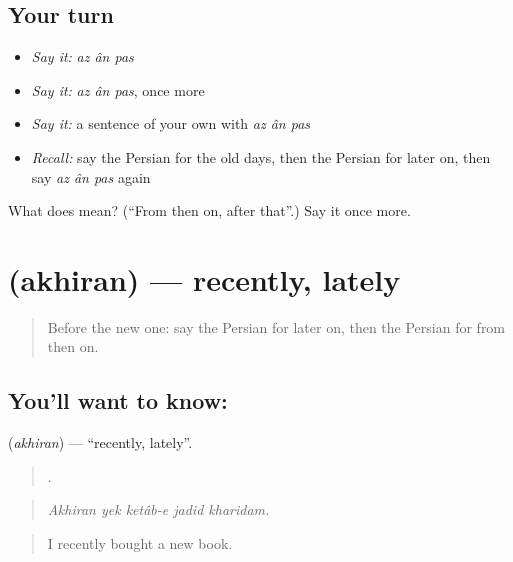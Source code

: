\subsection*{Your turn}
\begin{itemize}
\raggedright
  \item \emph{Say it:} \emph{az ân pas}
  \item \emph{Say it:} \emph{az ân pas}, once more
  \item \emph{Say it:} a sentence of your own with \emph{az ân pas}
  \item \emph{Recall:} say the Persian for the old days, then the Persian for later on, then say \emph{az ân pas} again
\end{itemize}

\begin{tcolorbox}[breakable,colback=teal!4,colframe=teal!35!black,title={Before you move on}]
What does    mean? (\textquotedblleft{}From then on, after that\textquotedblright{}.) Say it once more.
\end{tcolorbox}
\section[\texorpdfstring{\fa{اخیرا} (akhiran)}{اخیرا (akhiran)}]{ (akhiran) — recently, lately}

\label{lesson:FA-C304-akhiran}



\begin{quote}
Before the new one: say the Persian for later on, then the Persian for from then on.
\end{quote}

\subsection*{You'll want to know: }
\textbf{} (\emph{akhiran}) — \textquotedblleft{}recently, lately\textquotedblright{}.

\begin{quote}
    .
\end{quote}

\begin{quote}
\emph{Akhiran yek ketâb-e jadid kharidam.}
\end{quote}

\begin{quote}
I recently bought a new book.
\end{quote}

